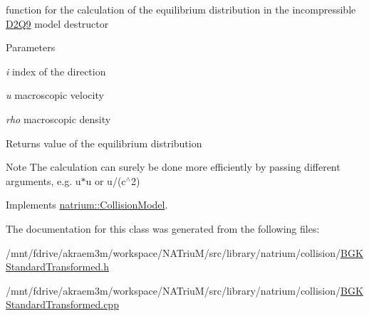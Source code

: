function for the calculation of the equilibrium distribution in the incompressible \hyperlink{classnatrium_1_1D2Q9}{D2Q9} model destructor


\begin{DoxyParams}{Parameters}
\item[{\em i}]index of the direction \item[{\em u}]macroscopic velocity \item[{\em rho}]macroscopic density \end{DoxyParams}
\begin{DoxyReturn}{Returns}
value of the equilibrium distribution 
\end{DoxyReturn}
\begin{DoxyNote}{Note}
The calculation can surely be done more efficiently by passing different arguments, e.g. u$\ast$u or u/(c$^\wedge$2) 
\end{DoxyNote}


Implements \hyperlink{classnatrium_1_1CollisionModel_a88b382d63da80e950bc58e8afad769a6}{natrium::CollisionModel}.

The documentation for this class was generated from the following files:\begin{DoxyCompactItemize}
\item 
/mnt/fdrive/akraem3m/workspace/NATriuM/src/library/natrium/collision/\hyperlink{BGKStandardTransformed_8h}{BGKStandardTransformed.h}\item 
/mnt/fdrive/akraem3m/workspace/NATriuM/src/library/natrium/collision/\hyperlink{BGKStandardTransformed_8cpp}{BGKStandardTransformed.cpp}\end{DoxyCompactItemize}
